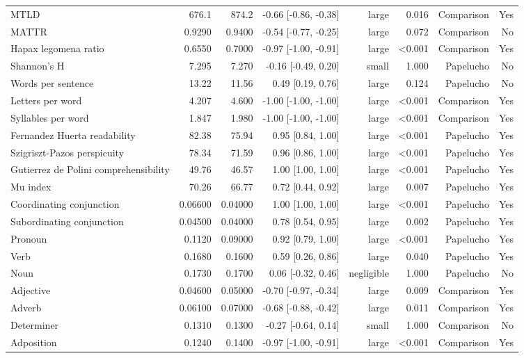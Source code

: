 \begin{table}[htbp]
\begin{tabular}{lrrrrrrr}
MTLD & 676.1 & 874.2 & -0.66 [-0.86, -0.38] & large & 0.016 & Comparison & Yes \\
MATTR & 0.9290 & 0.9400 & -0.54 [-0.77, -0.25] & large & 0.072 & Comparison & No \\
Hapax legomena ratio & 0.6550 & 0.7000 & -0.97 [-1.00, -0.91] & large & <0.001 & Comparison & Yes \\
Shannon's H & 7.295 & 7.270 & -0.16 [-0.49, 0.20] & small & 1.000 & Papelucho & No \\
Words per sentence & 13.22 & 11.56 & 0.49 [0.19, 0.76] & large & 0.124 & Papelucho & No \\
Letters per word & 4.207 & 4.600 & -1.00 [-1.00, -1.00] & large & <0.001 & Comparison & Yes \\
Syllables per word & 1.847 & 1.980 & -1.00 [-1.00, -1.00] & large & <0.001 & Comparison & Yes \\
Fernandez Huerta readability & 82.38 & 75.94 & 0.95 [0.84, 1.00] & large & <0.001 & Papelucho & Yes \\
Szigriszt-Pazos perspicuity & 78.34 & 71.59 & 0.96 [0.86, 1.00] & large & <0.001 & Papelucho & Yes \\
Gutierrez de Polini comprehensibility & 49.76 & 46.57 & 1.00 [1.00, 1.00] & large & <0.001 & Papelucho & Yes \\
Mu index & 70.26 & 66.77 & 0.72 [0.44, 0.92] & large & 0.007 & Papelucho & Yes \\
Coordinating conjunction & 0.06600 & 0.04000 & 1.00 [1.00, 1.00] & large & <0.001 & Papelucho & Yes \\
Subordinating conjunction & 0.04500 & 0.04000 & 0.78 [0.54, 0.95] & large & 0.002 & Papelucho & Yes \\
Pronoun & 0.1120 & 0.09000 & 0.92 [0.79, 1.00] & large & <0.001 & Papelucho & Yes \\
Verb & 0.1680 & 0.1600 & 0.59 [0.26, 0.86] & large & 0.040 & Papelucho & Yes \\
Noun & 0.1730 & 0.1700 & 0.06 [-0.32, 0.46] & negligible & 1.000 & Papelucho & No \\
Adjective & 0.04600 & 0.05000 & -0.70 [-0.97, -0.34] & large & 0.009 & Comparison & Yes \\
Adverb & 0.06100 & 0.07000 & -0.68 [-0.88, -0.42] & large & 0.011 & Comparison & Yes \\
Determiner & 0.1310 & 0.1300 & -0.27 [-0.64, 0.14] & small & 1.000 & Comparison & No \\
Adposition & 0.1240 & 0.1400 & -0.97 [-1.00, -0.91] & large & <0.001 & Comparison & Yes \\

\end{tabular}
\end{table}
